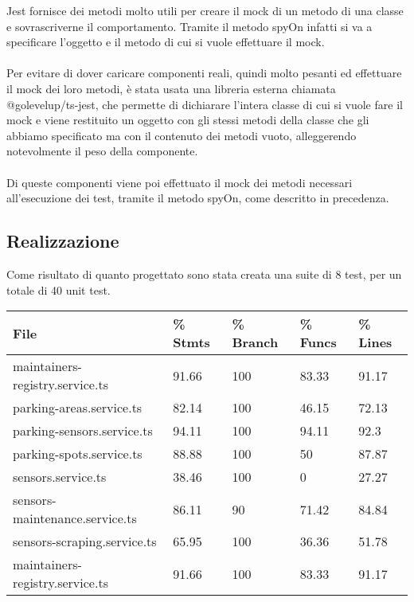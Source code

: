 Jest fornisce dei metodi molto utili per creare il mock di un metodo di una classe e sovrascriverne il comportamento.
Tramite il metodo spyOn infatti si va a specificare l'oggetto e il metodo di cui si vuole effettuare il mock.
\\\\
Per evitare di dover caricare componenti reali, quindi molto pesanti ed effettuare il mock dei loro metodi, è stata
usata una libreria esterna chiamata @golevelup/ts-jest, che permette di dichiarare l'intera classe di cui si vuole fare
il mock e viene restituito un oggetto con gli stessi metodi della classe che gli abbiamo specificato ma con il contenuto 
dei metodi vuoto, 
alleggerendo notevolmente il peso della componente.
\\\\
Di queste componenti viene poi effettuato il mock dei metodi necessari all'esecuzione dei test, tramite il metodo
spyOn, come descritto in precedenza.

\subsection{Realizzazione}
Come risultato di quanto progettato sono stata creata una suite di 8 test, per un totale di 40 unit test.
\\
\begin{table}
    \begin{tabular}{|p{5cm}|p{1.4cm}|p{1.5cm}|p{1.4cm}| p{1.4cm} |} 
    \hline
    File & \% Stmts & \% Branch &  \% Funcs & \% Lines \\ 
    \hline
    maintainers-registry.service.ts & 91.66 & 100 & 83.33 & 91.17 \\ 
    \hline
    parking-areas.service.ts & 82.14 & 100 & 46.15 & 72.13 \\ 
    \hline
    parking-sensors.service.ts & 94.11 & 100 & 94.11 & 92.3 \\ 
    \hline
    parking-spots.service.ts & 88.88 & 100 & 50 & 87.87 \\ 
    \hline
    sensors.service.ts & 38.46 & 100 & 0 & 27.27 \\ 
    \hline
    sensors-maintenance.service.ts & 86.11 & 90 & 71.42 & 84.84 \\ 
    \hline
    sensors-scraping.service.ts & 65.95 & 100 & 36.36 & 51.78 \\ 
    \hline
    maintainers-registry.service.ts & 91.66 & 100 & 83.33 & 91.17 \\ 
    \hline
    \end{tabular}
\end{table}


